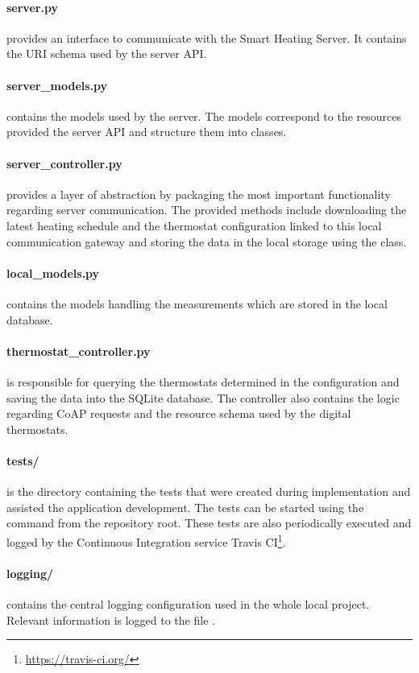 \paragraph{server.py} provides an interface to communicate with the Smart Heating Server.
It contains the URI schema used by the server API.

\paragraph{server\_models.py} contains the models used by the server.
The models correspond to the resources provided the server API and structure them into classes.

\paragraph{server\_controller.py} provides a layer of abstraction by packaging the most important functionality regarding server communication.
The provided methods include downloading the latest heating schedule and the thermostat configuration linked to this local communication gateway and storing the data in the local storage using the  class.

\paragraph{local\_models.py} contains the models handling the measurements which are stored in the local database.

\paragraph{thermostat\_controller.py} is responsible for querying the thermostats determined in the configuration and saving the data into the SQLite database.
The controller also contains the logic regarding CoAP requests and the resource schema used by the digital thermostats.

\paragraph{tests/} is the directory containing the tests that were created during implementation and assisted the application development.
The tests can be started using the command  from the repository root.
These tests are also periodically executed and logged by the Continuous Integration service Travis CI\footnote{\url{https://travis-ci.org/}}.

\paragraph{logging/} contains the central logging configuration used in the whole local project.
Relevant information is logged to the file .






